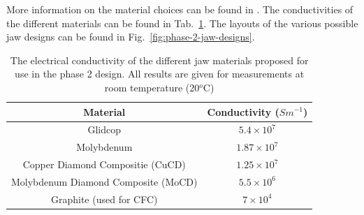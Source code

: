 More information on the material choices can be found in \cite{Bertarelli:Mat, Bertarelli:HiRadMat}. The conductivities of the different materials can be found in Tab.~\ref{tab:phase2-cond}. The layouts of the various possible jaw designs can be found in Fig.~\ref{fig:phase-2-jaw-designs}.

\begin{table}
\caption{The electrical conductivity of the different jaw materials proposed for use in the phase 2 design. All results are given for measurements at room temperature (20$^{o}$C)}
\begin{center}
\begin{tabular}{c | c }
Material & Conductivity ($S m^{-1}$) \\ \hline
Glidcop & $5.4 \times 10^{7}$ \\ \hline
Molybdenum & $1.87 \times 10^{7}$ \\ \hline
Copper Diamond Compositie (CuCD) & $1.25 \times 10^{7}$ \\ \hline
Molybdenum Diamond Composite (MoCD) & $5.5 \times 10^{6}$ \\ \hline
Graphite (used for CFC) & $7 \times 10^{4}$ \\ \hline
\end{tabular}
\end{center}
\label{tab:phase2-cond}
\end{table}

